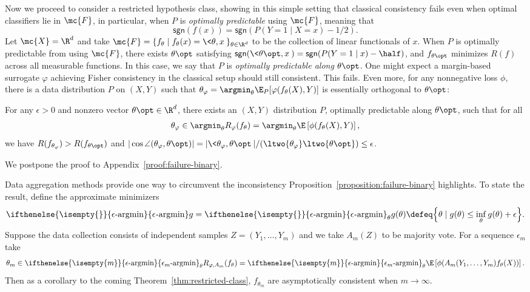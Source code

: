 \documentclass[11pt]{article}
\newcommand{\brk}[1]{\left[{#1}\right]} %
\newcommand{\sgn}{\mathsf{sgn}}  %
\newcommand{\sloss}{\varphi}  %
\newcommand{\epsargmin}[1][]{
  \ifthenelse{\isempty{#1}}{%
    \mathop{\epsilon\textup{-argmin}}
  }{%
    \mathop{\epsilon_{#1}\textup{-argmin}}
  }
}
\begin{document}
Now we proceed to consider a restricted hypothesis class, showing in this
simple setting that classical consistency fails even when
optimal classifiers lie in $\mc{F}$, in particular,
when $P$ is \emph{optimally predictable} using $\mc{F}$, meaning that
\begin{equation}
  \label{eqn:optimally-predictable}
  \sgn(f(x)) = \sgn(P(Y = 1 \mid X = x) - 1/2).
\end{equation}
%
Let $\mc{X} = \R^d$ and take $\mc{F} = \{f_\theta \mid f_\theta(x) =
\<\theta, x\>\}_{\theta \in \R^d}$ to be the collection of linear
functionals of $x$.
%
When $P$ is optimally predictable from using $\mc{F}$, there
exists $\theta\opt$ satisfying
$\sgn(\<\theta\opt, x\>) = \sgn(P(Y = 1 \mid x) - \half)$,
and $f_{\theta\opt}$ minimizes $R(f)$ across all measurable functions.
%
In this case, we say that $P$ is \emph{optimally predictable along
$\theta\opt$}.
%
One might expect a margin-based surrogate $\varphi$ achieving Fisher
consistency in the classical setup should still consistent.
%
This fails.
%
Even more, for any nonnegative loss $\phi$, there is a data distribution $P$
on $(X, Y)$ such that $\theta_\sloss = \argmin_\theta
\E_P[\sloss(f_\theta(X), Y)]$ is essentially orthogonal to $\theta\opt$:


\begin{proposition}
  \label{proposition:failure-binary}
  For any $\epsilon > 0$ and nonzero vector $\theta\opt \in \R^d$, there
  exists an $(X,Y)$ distribution $P$, optimally
  predictable
  along $\theta\opt$, such that for all
  \begin{align*}
    \theta_\sloss \in \argmin_{\theta} R_\sloss (f_\theta)
    = \argmin_{\theta} \E\left[\phi(f_\theta(X), Y)\right],
  \end{align*}
  we have $R(f_{\theta_\sloss}) > R(f_{\theta\opt})$ and $|\cos \angle
    (\theta_\sloss, \theta\opt )| = |\<\theta_\sloss, \theta\opt\>|/
    (\ltwo{\theta_\sloss} \ltwo{\theta\opt}) \leq \epsilon$.
\end{proposition}
\noindent
We postpone the proof to Appendix~\ref{proof:failure-binary}.

Data aggregation methods provide one way to circumvent the inconsistency
Proposition~\ref{proposition:failure-binary} highlights.
%
To state the result, define the approximate minimizers
\begin{equation*}
  \epsargmin g = \epsargmin_\theta g(\theta) \defeq
  \Big\{\theta \mid g(\theta) \le
  \inf_\theta g(\theta) + \epsilon \Big\}.
\end{equation*}
Suppose the data collection consists of independent samples $Z=(Y_1, \ldots,
Y_m)$ and we take $A_m(Z)$ to be majority vote.
%
For a sequence $\epsilon_m$ take
\begin{align*}
  \theta_m \in \epsargmin[m]_{\theta}
  R_{\sloss,A_m}(f_\theta)
  = \epsargmin[m]_{\theta} \E \brk{\phi(A_m(Y_1, \ldots, Y_m) f_\theta(X))}.
\end{align*}
Then as a corollary to the coming Theorem~\ref{thm:restricted-class},
$f_{\theta_m}$ are asymptotically consistent when $m \to \infty$.
\end{document}
